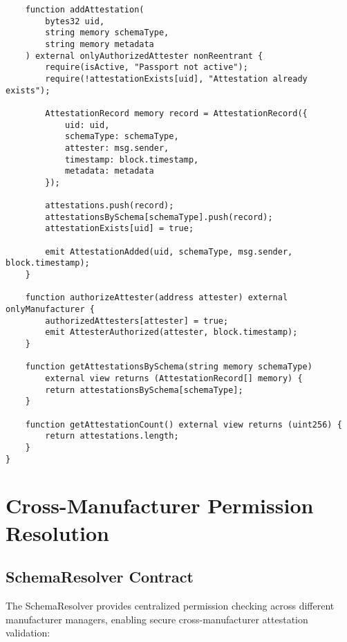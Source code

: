 \documentclass[11pt,a4paper]{article}
\begin{document}
\begin{verbatim}
    function addAttestation(
        bytes32 uid,
        string memory schemaType,
        string memory metadata
    ) external onlyAuthorizedAttester nonReentrant {
        require(isActive, "Passport not active");
        require(!attestationExists[uid], "Attestation already exists");
        
        AttestationRecord memory record = AttestationRecord({
            uid: uid,
            schemaType: schemaType,
            attester: msg.sender,
            timestamp: block.timestamp,
            metadata: metadata
        });
        
        attestations.push(record);
        attestationsBySchema[schemaType].push(record);
        attestationExists[uid] = true;
        
        emit AttestationAdded(uid, schemaType, msg.sender, block.timestamp);
    }
    
    function authorizeAttester(address attester) external onlyManufacturer {
        authorizedAttesters[attester] = true;
        emit AttesterAuthorized(attester, block.timestamp);
    }
    
    function getAttestationsBySchema(string memory schemaType) 
        external view returns (AttestationRecord[] memory) {
        return attestationsBySchema[schemaType];
    }
    
    function getAttestationCount() external view returns (uint256) {
        return attestations.length;
    }
}
\end{verbatim}

\section{Cross-Manufacturer Permission Resolution}

\subsection{SchemaResolver Contract}

The SchemaResolver provides centralized permission checking across different manufacturer managers, enabling secure cross-manufacturer attestation validation:
\end{document}
